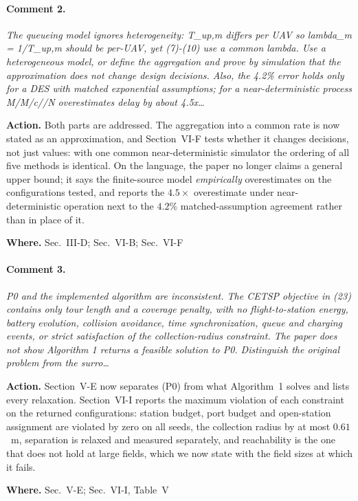 \documentclass[10pt]{article}
\newcommand{\rev}[1]{\par\medskip\noindent\textit{#1}\par\smallskip}
\newcommand{\act}[2]{\noindent\textbf{Action.} #1\par\noindent\textbf{Where.} #2\par}
\begin{document}
\paragraph{Comment 2.}
\rev{The queueing model ignores heterogeneity: T\_up,m differs per UAV so lambda\_m = 1/T\_up,m should be per-UAV, yet (7)-(10) use a common lambda. Use a heterogeneous model, or define the aggregation and prove by simulation that the approximation does not change design decisions. Also, the 4.2\% error holds only for a DES with matched exponential assumptions; for a near-deterministic process M/M/c//N overestimates delay by about 4.5x\dots}
\act{Both parts are addressed. The aggregation into a common rate is now stated as an approximation, and Section~VI-F tests whether it changes decisions, not just values: with one common near-deterministic simulator the ordering of all five methods is identical. On the language, the paper no longer claims a general upper bound; it says the finite-source model \emph{empirically} overestimates on the configurations tested, and reports the $4.5\times$ overestimate under near-deterministic operation next to the $4.2\%$ matched-assumption agreement rather than in place of it.}{Sec.~III-D; Sec.~VI-B; Sec.~VI-F}

\paragraph{Comment 3.}
\rev{P0 and the implemented algorithm are inconsistent. The CETSP objective in (23) contains only tour length and a coverage penalty, with no flight-to-station energy, battery evolution, collision avoidance, time synchronization, queue and charging events, or strict satisfaction of the collection-radius constraint. The paper does not show Algorithm 1 returns a feasible solution to P0. Distinguish the original problem from the surro\dots}
\act{Section~V-E now separates (P0) from what Algorithm~1 solves and lists every relaxation. Section~VI-I reports the maximum violation of each constraint on the returned configurations: station budget, port budget and open-station assignment are violated by zero on all seeds, the collection radius by at most $0.61$~m, separation is relaxed and measured separately, and reachability is the one that does not hold at large fields, which we now state with the field sizes at which it fails.}{Sec.~V-E; Sec.~VI-I, Table~V}
\end{document}
